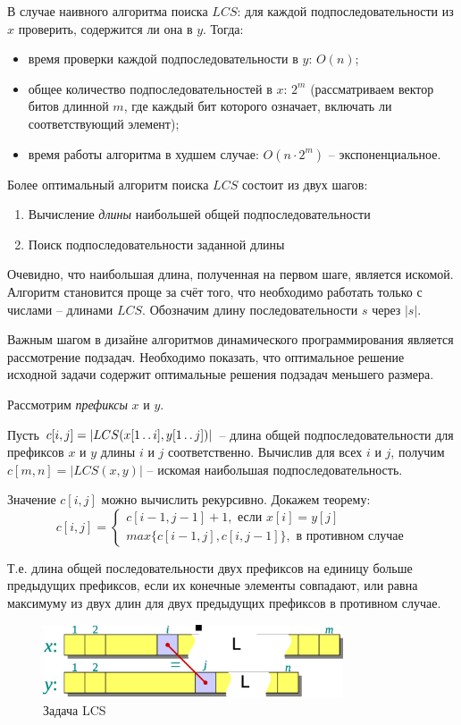 \documentclass[a4paper,11pt]{article}
\begin{document}
В случае наивного алгоритма поиска $LCS$: для каждой подпоследовательности из
$x$ проверить, содержится ли она в $y$. Тогда:
\begin{itemize}
\item время проверки каждой подпоследовательности в $y$: $O(n)$;
\item общее количество подпоследовательностей в $x$: $2^m$ (рассматриваем вектор
битов длинной $m$, где каждый бит которого означает, включать ли соответствующий
элемент);
\item время работы алгоритма в худшем случае: $O(n \cdot 2^m)$ -- экспоненциальное.
\end{itemize}

Более оптимальный алгоритм поиска $LCS$ состоит из двух шагов:
\begin{enumerate}
\item Вычисление \emph{длины} наибольшей общей подпоследовательности
\item Поиск подпоследовательности заданной длины
\end{enumerate}

Очевидно, что наибольшая длина, полученная на первом шаге, является искомой.
Алгоритм становится проще за счёт того, что необходимо работать только с
числами -- длинами $LCS$. Обозначим длину последовательности $s$ через $|s|$.

Важным шагом в дизайне алгоритмов динамического программирования является
рассмотрение подзадач. Необходимо показать, что оптимальное решение исходной
задачи содержит оптимальные решения подзадач меньшего размера.

Рассмотрим \emph{префиксы} $x$ и $y$. 

Пусть $c[i, j] = |LCS(x[1 \mathinner{\ldotp\ldotp} i], y[1 \mathinner{\ldotp\ldotp} j])|$ -- длина общей
подпоследовательности для префиксов $x$ и $y$ длины $i$ и $j$
соответственно. Вычислив для всех $i$ и $j$, получим
$c[m, n] = |LCS(x, y)|$ -- искомая наибольшая подпоследовательность.

Значение $c[i, j]$ можно вычислить рекурсивно. Докажем теорему:
\begin{equation*}
  c[i, j] = \begin{cases}
    c[i-1, j-1] + 1, \text{ если } x[i] = y[j] \\
    max\{c[i-1, j], c[i, j-1]\}, \text{ в противном случае}
    \end{cases}
\end{equation*}

Т.е. длина общей последовательности двух префиксов на единицу больше
предыдущих префиксов, если их конечные элементы совпадают, или равна
максимуму из двух длин для двух предыдущих префиксов в противном случае.
\begin{figure}[ht]
  \centering
  \includegraphics[width=3.5in]{lecture8/lcs.eps}
  \caption{Задача LCS}
\end{figure}
\end{document}
